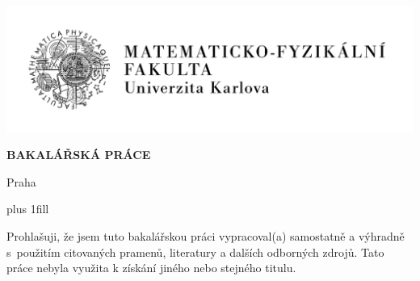 

\pagestyle{empty}
\hypersetup{pageanchor=false}

\begin{center}

\centerline{\mbox{\includegraphics[width=166mm]{img/logo-cs.pdf}}}

\vspace{-8mm}
\vfill

{\bf\Large BAKALÁŘSKÁ PRÁCE}

\vfill

{\LARGE\AutorPrace}

\vspace{15mm} 

{\LARGE\bfseries\NazevPrace}

\vfill

\Katedra

\vfill

{
\centerline{\vbox{}}}

\vfill

Praha \RokOdevzdani

\end{center}

\newpage



\openright
\hypersetup{pageanchor=true}
\pagestyle{plain}
\vglue 0pt plus 1fill

\noindent
Prohlašuji, že jsem tuto bakalářskou práci vypracoval(a) samostatně a výhradně
s~použitím citovaných pramenů, literatury a dalších odborných zdrojů.
Tato práce nebyla využita k získání jiného nebo stejného titulu.

